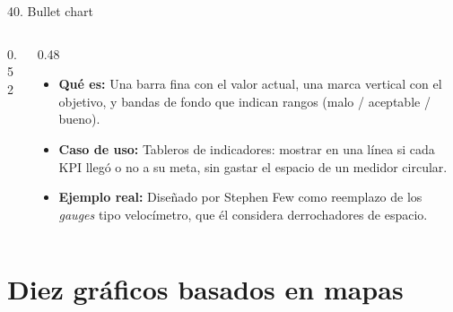 \documentclass[aspectratio=169,9pt]{beamer}
\newcommand{\ficha}[3]{%
\begin{itemize}
\item \textbf{Qué es:} #1
\item \textbf{Caso de uso:} #2
\item \textbf{Ejemplo real:} #3
\end{itemize}}
\begin{document}
\begin{frame}{40. Bullet chart}
\begin{columns}[T]
\begin{column}{0.52\textwidth}
\centering
{}
\end{column}
\begin{column}{0.48\textwidth}
\ficha{Una barra fina con el valor actual, una marca vertical con el objetivo, y bandas de fondo que indican rangos (malo / aceptable / bueno).}
{Tableros de indicadores: mostrar en una línea si cada KPI llegó o no a su meta, sin gastar el espacio de un medidor circular.}
{Diseñado por Stephen Few como reemplazo de los \emph{gauges} tipo velocímetro, que él considera derrochadores de espacio.}
\end{column}
\end{columns}
\end{frame}

\section{Diez gráficos basados en mapas}
\end{document}
